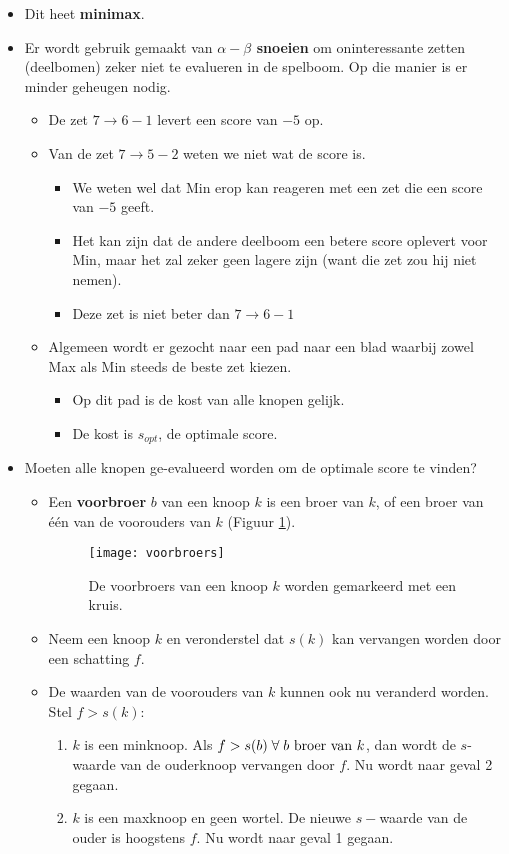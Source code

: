\begin{itemize}
\begin{itemize}
\begin{enumerate}
		\end{enumerate} 
		\item Dit heet \textbf{minimax}. 
		\item Er wordt gebruik gemaakt van \textbf{$\alpha-\beta$ snoeien} om oninteressante zetten (deelbomen) zeker niet te evalueren in de spelboom. Op die manier is er minder geheugen nodig.
		\begin{itemize}
			\item De zet $7\rightarrow6-1$ levert een score van $-5$ op.
			\item Van de zet $7\rightarrow5-2$ weten we niet wat de score is.
			\begin{itemize}
				\item We weten wel dat Min erop kan reageren met een zet die een score van $-5$ geeft.
				\item Het kan zijn dat de andere deelboom een betere score oplevert voor Min, maar het zal zeker geen lagere zijn (want die zet zou hij niet nemen).
				\item Deze zet is niet beter dan $7\rightarrow 6 - 1$	
		\end{itemize}
			\item Algemeen wordt er gezocht naar een pad naar een blad waarbij zowel Max als Min steeds de beste zet kiezen.
			\begin{itemize}
				\item Op dit pad is de kost van alle knopen gelijk.
				\item De kost is $s_{opt}$, de optimale score.
			\end{itemize}
		\end{itemize}
		\item Moeten alle knopen ge-evalueerd worden om de optimale score te vinden?
		\begin{itemize}
			\item Een \textbf{voorbroer} $b$ van een knoop $k$ is een broer van $k$, of een broer van één van de voorouders van $k$ (Figuur \ref{fig:voorbroers}).
			\begin{figure}
				\centering
				\texttt{[image: voorbroers]}
				\caption{De voorbroers van een knoop $k$ worden gemarkeerd met een kruis.}
				\label{fig:voorbroers}
			\end{figure}
			\item Neem een knoop $k$ en veronderstel dat $s(k)$ kan vervangen worden door een schatting $f$.
			\item De waarden van de voorouders van $k$ kunnen ook nu veranderd worden. Stel $f > s(k)$:
			\begin{enumerate}
				\item $k$ is een minknoop. Als $f >  s(b)\;\forall\;b \hbox{ broer van } k$, dan wordt de $s$-waarde van de ouderknoop vervangen door $f$. Nu wordt naar geval 2 gegaan.
				\item $k$ is een maxknoop en geen wortel. De nieuwe $s-$waarde van de ouder is hoogstens $f$. Nu wordt naar geval 1 gegaan.
			\end{enumerate}
		\end{itemize}
	\end{itemize}
\end{itemize}